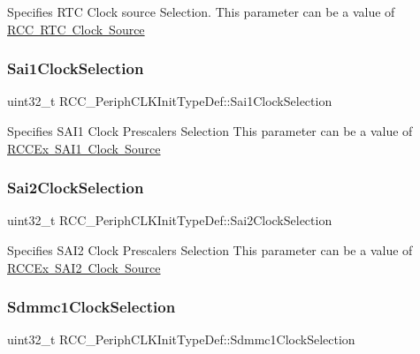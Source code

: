 Specifies R\+TC Clock source Selection. This parameter can be a value of \mbox{\hyperlink{group___r_c_c___r_t_c___clock___source}{R\+CC R\+TC Clock Source}} \mbox{\label{struct_r_c_c___periph_c_l_k_init_type_def_adc2a83ae9e108a3f7afb01c58f3a4f1a}} 
\subsubsection{\texorpdfstring{Sai1ClockSelection}{Sai1ClockSelection}}
{\footnotesize\ttfamily uint32\+\_\+t R\+C\+C\+\_\+\+Periph\+C\+L\+K\+Init\+Type\+Def\+::\+Sai1\+Clock\+Selection}

Specifies S\+A\+I1 Clock Prescalers Selection This parameter can be a value of \mbox{\hyperlink{group___r_c_c_ex___s_a_i1___clock___source}{R\+C\+C\+Ex S\+A\+I1 Clock Source}} \mbox{\label{struct_r_c_c___periph_c_l_k_init_type_def_a16f7cf65806df3589a4bab521315d8df}} 
\subsubsection{\texorpdfstring{Sai2ClockSelection}{Sai2ClockSelection}}
{\footnotesize\ttfamily uint32\+\_\+t R\+C\+C\+\_\+\+Periph\+C\+L\+K\+Init\+Type\+Def\+::\+Sai2\+Clock\+Selection}

Specifies S\+A\+I2 Clock Prescalers Selection This parameter can be a value of \mbox{\hyperlink{group___r_c_c_ex___s_a_i2___clock___source}{R\+C\+C\+Ex S\+A\+I2 Clock Source}} \mbox{\label{struct_r_c_c___periph_c_l_k_init_type_def_a4c0d4ae0c49428a29497ed36ba2685f9}} 
\subsubsection{\texorpdfstring{Sdmmc1ClockSelection}{Sdmmc1ClockSelection}}
{\footnotesize\ttfamily uint32\+\_\+t R\+C\+C\+\_\+\+Periph\+C\+L\+K\+Init\+Type\+Def\+::\+Sdmmc1\+Clock\+Selection}

